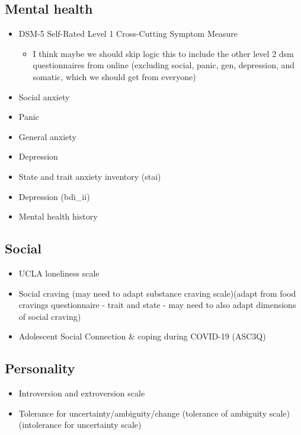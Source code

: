 \documentclass[]{book}
\providecommand{\tightlist}{%
  \setlength{\itemsep}{0pt}\setlength{\parskip}{0pt}}
\begin{document}
\hypertarget{mental-health}{%
\subsection{Mental health}\label{mental-health}}

\begin{itemize}
\tightlist
\item
  DSM-5 Self-Rated Level 1 Cross-Cutting Symptom Measure

  \begin{itemize}
  \tightlist
  \item
    I think maybe we should skip logic this to include the other level 2 dsm questionnaires from online (excluding social, panic, gen, depression, and somatic, which we should get from everyone)
  \end{itemize}
\item
  Social anxiety
\item
  Panic
\item
  General anxiety
\item
  Depression
\item
  State and trait anxiety inventory (stai)
\item
  Depression (bdi\_ii)
\item
  Mental health history
\end{itemize}

\hypertarget{social}{%
\subsection{Social}\label{social}}

\begin{itemize}
\tightlist
\item
  UCLA loneliness scale
\item
  Social craving (may need to adapt substance craving scale)(adapt from food cravings questionnaire - trait and state - may need to also adapt dimensions of social craving)
\item
  Adolescent Social Connection \& coping during COVID-19 (ASC3Q)
\end{itemize}

\hypertarget{personality}{%
\subsection{Personality}\label{personality}}

\begin{itemize}
\tightlist
\item
  Introversion and extroversion scale
\item
  Tolerance for uncertainty/ambiguity/change (tolerance of ambiguity scale)(intolerance for uncertainty scale)
\end{itemize}
\end{document}
